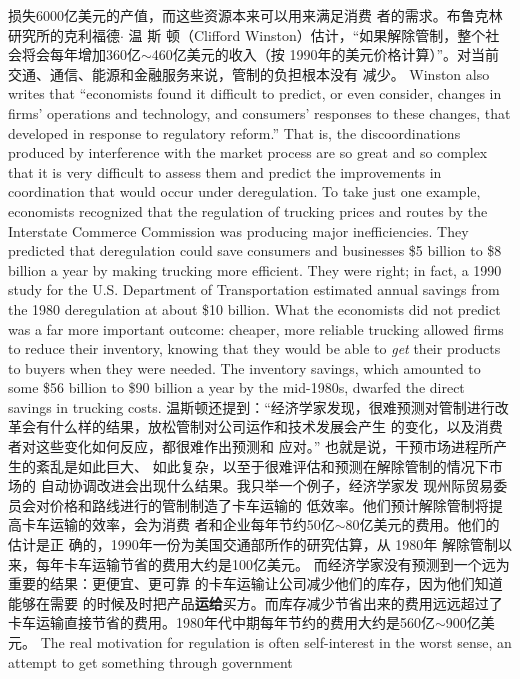 \begin{paracol}{2}
损失6000亿美元的产值，而这些资源本来可以用来满足消费
者的需求。布鲁克林研究所的克利福德$\cdot$ 温 斯 顿（Clifford Winston）估计，“如果解除管制，整个社会将会每年增加360亿$\sim$460亿美元的收入（按 1990年的美元价格计算）”。对当前交通、通信、能源和金融服务来说，管制的负担根本没有
减少。
\switchcolumn*
Winston also writes that ``economists found it difficult to
predict, or even consider, changes in firms' operations and technology, and consumers' responses to these changes, that developed in response to regulatory reform.'' That is, the discoordinations produced by interference with the market
process are so great and so complex that it is very difficult to assess them and predict the improvements in coordination that
would occur under deregulation. To take just one example,
economists recognized that the regulation of trucking prices
and routes by the Interstate Commerce Commission was producing major inefficiencies. They predicted that deregulation
could save consumers and businesses \$5 billion to \$8 billion a
year by making trucking more efficient. They were right; in
fact, a 1990 study for the U.S. Department of Transportation
estimated annual savings from the 1980 deregulation at about
\$10 billion. What the economists did not predict was a far
more important outcome: cheaper, more reliable trucking allowed firms to reduce their inventory, knowing that they would
be able to \textit{get} their products to buyers when they were needed.
The inventory savings, which amounted to some \$56 billion to
\$90 billion a year by the mid-1980s, dwarfed the direct savings
in trucking costs.
\switchcolumn
温斯顿还提到：“经济学家发现，很难预测对管制进行改
革会有什么样的结果，放松管制对公司运作和技术发展会产生
的变化，以及消费者对这些变化如何反应，都很难作出预测和
应对。” 也就是说，干预市场进程所产生的紊乱是如此巨大、
如此复杂，以至于很难评估和预测在解除管制的情况下市场的
自动协调改进会出现什么结果。我只举一个例子，经济学家发
现州际贸易委员会对价格和路线进行的管制制造了卡车运输的
低效率。他们预计解除管制将提高卡车运输的效率，会为消费
者和企业每年节约50亿$\sim$80亿美元的费用。他们的估计是正
确的，1990年一份为美国交通部所作的研究估算，从 1980年
解除管制以来，每年卡车运输节省的费用大约是100亿美元。
而经济学家没有预测到一个远为重要的结果：更便宜、更可靠
的卡车运输让公司减少他们的库存，因为他们知道能够在需要
的时候及时把产品\textbf{运给}买方。而库存减少节省出来的费用远远超过了卡车运输直接节省的费用。1980年代中期每年节约的费用大约是560亿$\sim$900亿美元。
\switchcolumn*
The real motivation for regulation is often self-interest in the
worst sense, an attempt to get something through government

\end{paracol}
